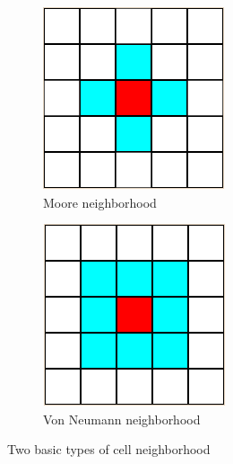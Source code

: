 \documentclass[12pt]{report}
\begin{document}
\begin{figure}[h]
	\centering
	\begin{subfigure}[b]{0.35\textwidth}
		\centering
		\includegraphics[width=\textwidth]{images/neighborsmoore}
		\caption{Moore neighborhood} 
	\end{subfigure}
	\hfill
	\begin{subfigure}[b]{0.35\textwidth}
		\centering
		\includegraphics[width=\textwidth]{images/neighborsvonneumann}
		\caption{Von Neumann neighborhood} 
	\end{subfigure} 
	\caption{Two basic types of cell neighborhood}
	\label{fig:neighborhood_types}
\end{figure}
\end{document}
